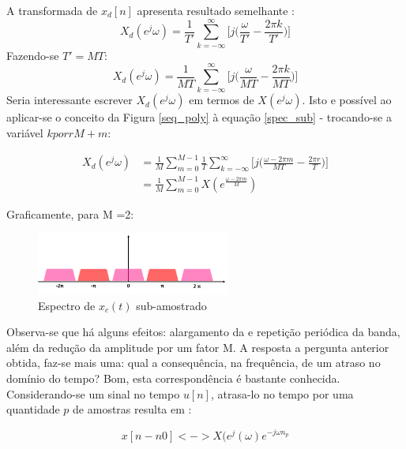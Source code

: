 A transformada de $x_{d}[n]$ apresenta resultado semelhante \cite{Krishna}: 
\begin{equation}
X_{d}(e^j\omega) = \frac{1}{T'}\sum_{k=-\infty}^{\infty}\bigg[j\bigg(\frac{\omega}{T'}-\frac{2\pi k}{T'}\bigg)\bigg]
\end{equation}
Fazendo-se $T'=MT$:
\begin{equation}\label{spec_sub}
X_{d}(e^j\omega) = \frac{1}{MT}\sum_{k=-\infty}^{\infty}\bigg[j\bigg(\frac{\omega}{MT}-\frac{2\pi k}{MT}\bigg)\bigg]
\end{equation}
Seria interessante escrever $X_{d}(e^j\omega)$ em termos de $X(e^j\omega)$. Isto e possível ao aplicar-se o conceito da Figura \ref{seq_poly} à equação \ref{spec_sub} - trocando-se a variável $k por rM + m$:

\begin{equation}\label{spec_sub1}
\begin{split}
X_{d}(e^j\omega) &= \frac{1}{M}\sum_{m=0}^{M-1}\frac{1}{T}\sum_{k=-\infty}^{\infty}\bigg[j\bigg(\frac{\omega - 2\pi m}{MT}-\frac{2\pi r}{T}\bigg)\bigg] \\
                 &= \frac{1}{M}\sum_{m=0}^{M-1}X(e^\frac{\omega - 2\pi m}{M})
\end{split}
\end{equation}

Graficamente, para M =2: 

\begin{figure}[h!]
\centering
\includegraphics[width=2.5in]{sub_2.png} %
\caption{Espectro de $x_c(t)$ sub-amostrado}
\label{x_freq1}
\end{figure}

Observa-se que há alguns efeitos: alargamento da e repetição periódica da banda, além da redução da amplitude por um fator M. 
A resposta a pergunta anterior obtida, faz-se mais uma: qual a consequência, na frequência, de um atraso no domínio do tempo? Bom, esta correspondência é bastante conhecida. Considerando-se um sinal no tempo $u[n]$,  atrasa-lo no tempo por uma quantidade $p$ de amostras resulta em \cite{Krishna}:

\begin{equation}\label{delay}
x[n-n{0}] <-> X(e^j(\omega)e^{-j\omega n_p}
\end{equation}

